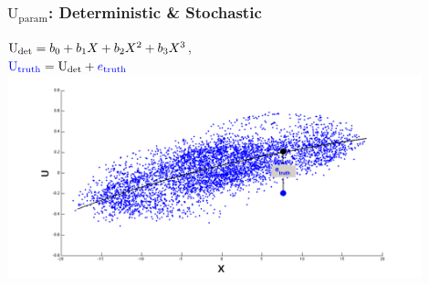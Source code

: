 \documentclass[graphics]{beamer}
\begin{document}
\begin{frame} %
   \frametitle{$\text{U}_{\text{param}}$: Deterministic \& Stochastic}
      ${\color{black} \text{U}_{\text{det}} = b_0 + b_1X + b_2X^2 + b_3X^3}$, \\
      \vspace{8pt}
      ${\color{blue} \text{U}_{\text{truth}}} = {\color{black} \text{U}_{\text{det}}} + {\color{blue} e_{\text{truth}}}$
      \includegraphics[width=0.9\textwidth, height=0.55\textwidth]{stoch_cloud_finalcurve_black}
\end{frame}
\end{document}
